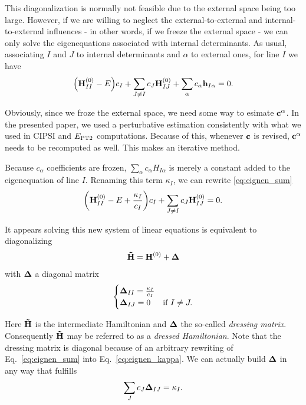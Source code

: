 \documentclass[./thesis.tex]{subfiles}
\begin{document}
This diagonalization is normally not feasible due to the external space being too large. However, if we are willing to neglect the external-to-external and internal-to-external influences - in other words, if we freeze the external space - we can only solve the eigenequations associated with internal determinants. As usual, associating $I$ and $J$ to internal determinants and $\alpha$ to external ones, for line $I$ we have
\begin{equation}
\qty({\bf H}^{(0)}_{II} - E)c_I  + \sum_{J \neq I} {c_J {\bf H}^{(0)}_{IJ}} + \sum_\alpha {c_\alpha {\bf h}_{I \alpha}} = 0.
\label{eq:eignen_sum}
\end{equation}


Obviously, since we froze the external space, we need some way to esimate ${\bf c}^\alpha$. In the presented paper, we used a perturbative estimation consistently with what we used in CIPSI and $E_\text{PT2}$ computations. Because of this, whenever $\bf c$ is revised, ${\bf c}^\alpha$ needs to be recomputed as well. This makes \Bk an iterative method.

Because $c_\alpha$ coefficients are frozen, $\sum_\alpha {c_\alpha H_{I \alpha}}$ is merely a constant added to the eigenequation of line $I$. Renaming this term $\kappa_I$, we can rewrite \ref{eq:eignen_sum}
\begin{equation}
\qty({\bf H}^{(0)}_{II} - E + \frac{\kappa_I}{c_I})c_I  + \sum_{J \neq I} {c_J {\bf H}^{(0)}_{IJ}} = 0.
\label{eq:eignen_kappa}
\end{equation}

It appears solving this new system of linear equations is equivalent to diagonalizing 
\begin{equation}
{\bf \tilde H} = {\bf H}^{(0)} + {\bf \Delta}
\end{equation}
with ${\bf \Delta}$ a diagonal matrix
\begin{equation}
\begin{cases}
{\bf \Delta}_{II}=\frac{\kappa_I}{c_I}\\
{\bf \Delta}_{IJ}=0 & \text{if } I \neq J.
\end{cases}
\end{equation}

Here ${\bf \tilde H}$ is the intermediate Hamiltonian and ${\bf \Delta}$ the so-called \emph{dressing matrix}. Consequently ${\bf \tilde H}$ may be referred to as a \emph{dressed Hamiltonian}. 
Note that the dressing matrix is diagonal because of an arbitrary rewriting of Eq.~\eqref{eq:eignen_sum} into Eq.~\eqref{eq:eignen_kappa}. We can actually build ${\bf \Delta}$ in any way that fulfills
\begin{equation}
\sum_J c_J {\bf \Delta}_{IJ}  = \kappa_I.
\label{eq:arbitrary_dressing}
\end{equation}
\end{document}
